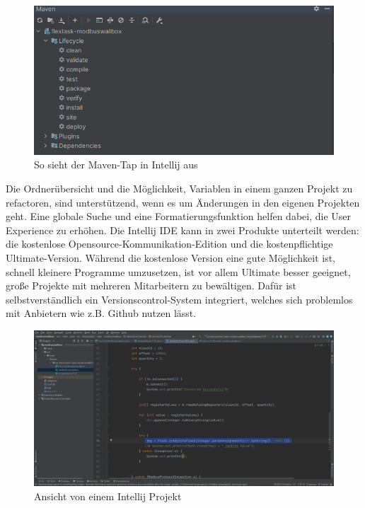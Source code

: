\begin{figure}[h t]
\centering
\includegraphics[scale=0.55]{pics/MavenOverfiew.png}
\caption{So sieht der Maven-Tap in Intellij aus}
\label{fig:impl:WallboxMavenTap}
\end{figure}


Die Ordnerübersicht und die Möglichkeit, Variablen in einem ganzen Projekt zu refactoren, sind unterstützend, wenn es um Änderungen in den eigenen Projekten geht. Eine globale Suche und eine Formatierungsfunktion helfen dabei, die User Experience zu erhöhen. Die Intellij IDE kann in zwei Produkte unterteilt werden: die kostenlose Opensource-Kommunikation-Edition und die kostenpflichtige Ultimate-Version. Während die kostenlose Version eine gute Möglichkeit ist, schnell kleinere Programme umzusetzen, ist vor allem Ultimate besser geeignet, große Projekte mit mehreren Mitarbeitern zu bewältigen. Dafür ist selbstverständlich ein Versionscontrol-System integriert, welches sich problemlos mit Anbietern wie z.B. Github nutzen lässt.


\begin{figure}[h t]
\centering
\includegraphics[scale=0.2]{pics/IntellijOverfiew.png}
\caption{Ansicht von einem Intellij Projekt}
\label{fig:impl:WallboxIntellij}
\end{figure}


